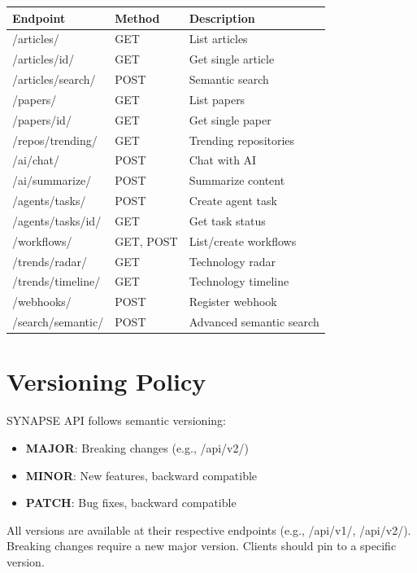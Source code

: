 \documentclass{report}
\begin{document}
\begin{center}
\begin{tabular}{llp{4cm}}
\toprule
\textbf{Endpoint} & \textbf{Method} & \textbf{Description} \\
\midrule
/articles/ & GET & List articles \\
/articles/{id}/ & GET & Get single article \\
/articles/search/ & POST & Semantic search \\
/papers/ & GET & List papers \\
/papers/{id}/ & GET & Get single paper \\
/repos/trending/ & GET & Trending repositories \\
/ai/chat/ & POST & Chat with AI \\
/ai/summarize/ & POST & Summarize content \\
/agents/tasks/ & POST & Create agent task \\
/agents/tasks/{id}/ & GET & Get task status \\
/workflows/ & GET, POST & List/create workflows \\
/trends/radar/ & GET & Technology radar \\
/trends/timeline/ & GET & Technology timeline \\
/webhooks/ & POST & Register webhook \\
/search/semantic/ & POST & Advanced semantic search \\
\bottomrule
\end{tabular}
\end{center}

\section{Versioning Policy}

SYNAPSE API follows semantic versioning:

\begin{itemize}
    \item \textbf{MAJOR}: Breaking changes (e.g., /api/v2/)
    \item \textbf{MINOR}: New features, backward compatible
    \item \textbf{PATCH}: Bug fixes, backward compatible
\end{itemize}

All versions are available at their respective endpoints (e.g., /api/v1/, /api/v2/). Breaking changes require a new major version. Clients should pin to a specific version.
\end{document}
